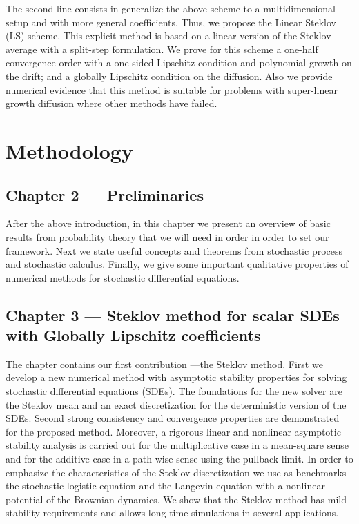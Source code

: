		The second line consists in generalize the above scheme to a multidimensional setup and with more general 
	coefficients. Thus, we propose the Linear Steklov (LS) scheme. This explicit method is based on  a linear version 
	of the Steklov average with a split-step formulation. We prove for this scheme a one-half 
	convergence order with a one sided Lipschitz condition and polynomial growth on the drift; and a globally 
	Lipschitz condition on the diffusion. Also we provide numerical evidence that this method is suitable for problems 
	with super-linear growth diffusion  where other methods have failed. 
	 
\section{Methodology}
		
	\subsection*{Chapter 2 --- Preliminaries}
			
			After the above introduction, in this chapter  we present an overview of basic results from probability 
		theory that we will need in order in order to set our framework.
		Next we state useful concepts and theorems from stochastic process and stochastic  calculus. 
		Finally, we give some important qualitative properties of numerical methods for stochastic differential 
		equations.
	
	\subsection*{Chapter 3 --- Steklov method for scalar SDEs with Globally Lipschitz coefficients}
	
			The chapter contains our first contribution ---the Steklov method. 
		First we develop a new numerical method with asymptotic stability properties for solving stochastic 
		differential equations (SDEs). The foundations for the new solver are the Steklov mean and an exact 
		discretization for the deterministic version of the SDEs. Second strong consistency and convergence properties 
		are demonstrated for the proposed method. Moreover, a rigorous linear and nonlinear asymptotic stability 
		analysis is carried out for the multiplicative case in a mean-square sense and for the additive case in a 
		path-wise sense using the pullback limit. In order to emphasize the characteristics of the Steklov 
		discretization we use as benchmarks the stochastic logistic equation and the Langevin equation with a nonlinear 
		potential of the Brownian dynamics. We show that the Steklov method has mild stability requirements and allows 
		long-time simulations in several applications.
	
